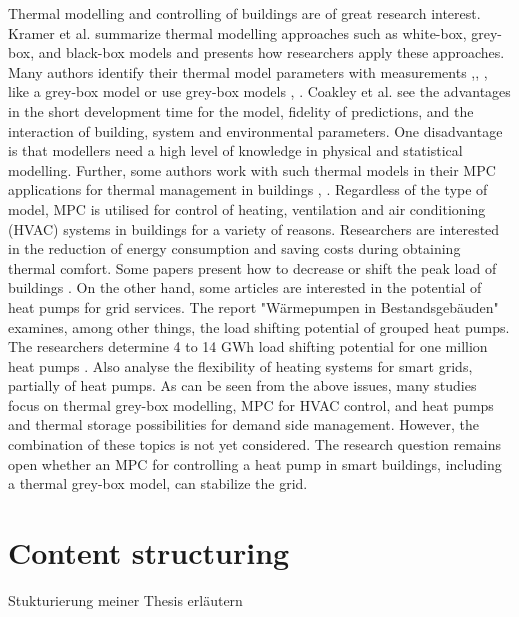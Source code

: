 Thermal modelling and controlling of buildings are of great research interest. Kramer et al. \cite{Kramer.2012} summarize thermal modelling approaches such as white-box, grey-box, and black-box models and presents how researchers apply these approaches. Many authors identify their thermal model parameters with measurements \cite{Siroky.2011},\cite{Hazyuk.2012}, \cite{Park.2011}, like a grey-box model or use grey-box models \cite{Freund.2020}, \cite{EvelynSperber.2019}. Coakley et al. \cite{Coakley.2014} see the advantages in the short development time for the model, fidelity of predictions, and the interaction of building, system and environmental parameters. One disadvantage is that modellers need a high level of knowledge in physical and statistical modelling.
Further, some authors work with such thermal models in their MPC applications for thermal management in buildings \cite{JiriCigler.}, \cite{Hazyuk.2012b}. 
\newline
Regardless of the type of model, MPC is utilised for control of heating, ventilation and air conditioning (HVAC) systems in buildings for a variety of reasons. Researchers are interested in the reduction of energy consumption \cite{Hazyuk.2012b} and saving costs \cite{Zwickel.2019} during obtaining thermal comfort. Some papers present how to decrease or shift the peak load of buildings \cite{Oldewurtel.2010}.
\newline
On the other hand, some articles are interested in the potential of heat pumps for grid services.
The report "Wärmepumpen in Bestandsgebäuden" examines, among other things, the load shifting potential of grouped heat pumps. The researchers determine 4 to 14 GWh load shifting potential for one million heat pumps \cite{WPimBestand.2020}.
Also \cite{Kohlhepp.2017} analyse the flexibility of heating systems for smart grids, partially of heat pumps. 
\newline
As can be seen from the above issues, many studies focus on thermal grey-box modelling, MPC for HVAC control, and heat pumps and thermal storage possibilities for demand side management. However, the combination of these topics is not yet considered. The research question remains open whether an MPC for controlling a heat pump in smart buildings, including a thermal grey-box model, can stabilize the grid.  
 




\section{Content structuring}
\label{section:contentstructuring}
Stukturierung meiner Thesis erläutern